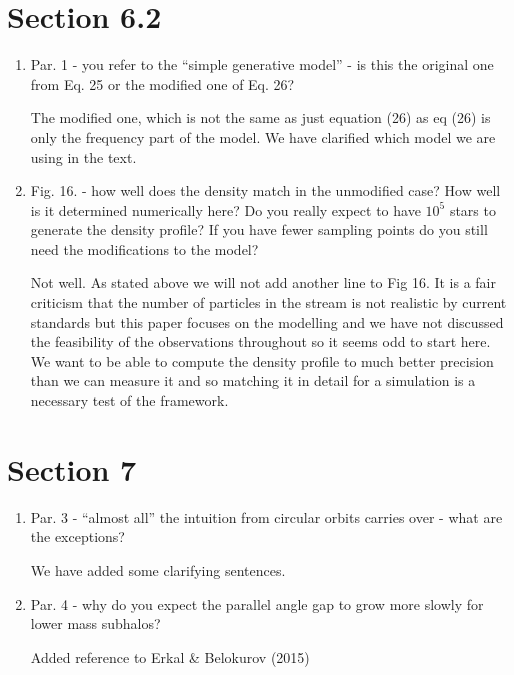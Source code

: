 \documentclass{article}
\begin{document}
\section{Section 6.2}
\begin{enumerate}
\item Par. 1 - you refer to the “simple generative model” - is this the original one from Eq. 25
or the modified one of Eq. 26?

{\color{red} The modified one, which is not the same as just equation (26) as eq (26) is only the frequency part of the model. We have clarified which model we are using in the text.}

\item Fig. 16. - how well does the density match in the unmodified case? How well is it
determined numerically here? Do you really expect to have $10^5$ stars to generate the
density profile? If you have fewer sampling points do you still need the modifications to
the model?

{\color{red} Not well. As stated above we will not add another line to Fig 16. It is a fair criticism that the number of particles in the stream is not realistic by current standards but this paper focuses on the modelling and we have not discussed the feasibility of the observations throughout so it seems odd to start here. We want to be able to compute the density profile to much better precision than we can measure it and so matching it in detail for a simulation is a necessary test of the framework.}

\end{enumerate}
\section{Section 7}
\begin{enumerate}
\item Par. 3 - “almost all” the intuition from circular orbits carries over - what are the
exceptions?

{\color{red} We have added some clarifying sentences.}

\item Par. 4 - why do you expect the parallel angle gap to grow more slowly for lower mass
subhalos?

{\color{red} Added reference to Erkal \& Belokurov (2015)}

\end{enumerate}
\end{document}
